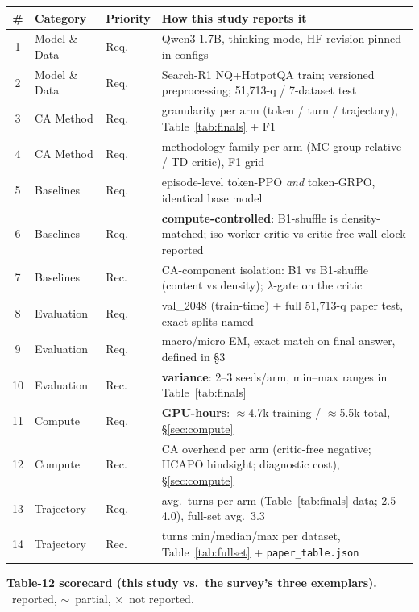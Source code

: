 \documentclass[11pt,a4paper]{article}
\newcommand{\chk}{\textcolor{green!55!black}{\checkmark}}
\newcommand{\prt}{\textcolor{orange!85!black}{$\sim$}}
\newcommand{\non}{\textcolor{red!70!black}{$\times$}}
\begin{document}
\begin{table}[h]
\centering\footnotesize
\begin{tabular}{c l l p{7.6cm}}
\toprule
\# & Category & Priority & How this study reports it \\
\midrule
1  & Model \& Data & Req. & Qwen3-1.7B, thinking mode, HF revision pinned in configs \\
2  & Model \& Data & Req. & Search-R1 NQ+HotpotQA train; versioned preprocessing; 51{,}713-q / 7-dataset test \\
3  & CA Method & Req. & granularity per arm (token / turn / trajectory), Table~\ref{tab:finals} + F1 \\
4  & CA Method & Req. & methodology family per arm (MC group-relative / TD critic), F1 grid \\
5  & Baselines & Req. & episode-level token-PPO \emph{and} token-GRPO, identical base model \\
6  & Baselines & Req. & \textbf{compute-controlled}: B1-shuffle is density-matched; iso-worker critic-vs-critic-free wall-clock reported \\
7  & Baselines & Rec. & CA-component isolation: B1 vs B1-shuffle (content vs density); $\lambda$-gate on the critic \\
8  & Evaluation & Req. & val\_2048 (train-time) + full 51{,}713-q paper test, exact splits named \\
9  & Evaluation & Req. & macro/micro EM, exact match on final answer, defined in \S3 \\
10 & Evaluation & Rec. & \textbf{variance}: 2--3 seeds/arm, min--max ranges in Table~\ref{tab:finals} \\
11 & Compute & Req. & \textbf{GPU-hours}: $\approx$4.7k training / $\approx$5.5k total, \S\ref{sec:compute} \\
12 & Compute & Rec. & CA overhead per arm (critic-free negative; HCAPO hindsight; diagnostic cost), \S\ref{sec:compute} \\
13 & Trajectory & Req. & avg.\ turns per arm (Table~\ref{tab:finals} data; 2.5--4.0), full-set avg.\ 3.3 \\
14 & Trajectory & Rec. & turns min/median/max per dataset, Table~\ref{tab:fullset} + \texttt{paper\_table.json} \\
\bottomrule
\end{tabular}
\end{table}

\noindent\textbf{Table-12 scorecard (this study vs.\ the survey's three exemplars).}
\chk\ reported, \prt\ partial, \non\ not reported.
\end{document}
